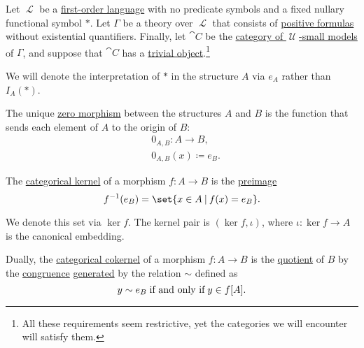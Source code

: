 \begin{proposition}\label{thm:zero_morphisms_pointed}
  Let \( \mscrL \) be a \hyperref[def:first_order_language]{first-order language} with no predicate symbols and a fixed nullary functional symbol \( \ast \). Let \( \Gamma \) be a theory over \( \mscrL \) that consists of \hyperref[def:positive_formula]{positive formulas} without existential quantifiers. Finally, let \( \cat{C} \) be the \hyperref[def:category_of_small_first_order_models]{category of \( \mscrU \)-small models} of \( \Gamma \), and suppose that \( \cat{C} \) has a \hyperref[def:trivial_object]{trivial object}.\footnote{All these requirements seem restrictive, yet the categories we will encounter will satisfy them.}

  We will denote the interpretation of \( \ast \) in the structure \( A \) via \( e_A \) rather than \( I_A(\ast) \).

  \begin{thmenum}
     The unique \hyperref[def:zero_morphisms/morphism]{zero morphism} between the structures \( A \) and \( B \) is the function that sends each element of \( A \) to the origin of \( B \):
    \begin{equation*}
      \begin{aligned}
        &0_{A,B}: A \to B, \\
        &0_{A,B}(x) \coloneqq e_B.
      \end{aligned}
    \end{equation*}

     The \hyperref[def:zero_morphisms/kernel]{categorical kernel} of a morphism \( f: A \to B \) is the \hyperref[def:set_valued_map/inverse]{preimage}
    \begin{equation*}
      f^{-1}(e_B) = \set{ x \in A \given f(x) = e_B }.
    \end{equation*}

    We denote this set via \( \ker f \). The kernel pair is \( (\ker f, \iota) \), where \( \iota: \ker f \to A \) is the canonical embedding.

     Dually, the \hyperref[def:zero_morphisms/cokernel]{categorical cokernel} of a morphism \( f: A \to B \) is the \hyperref[def:first_order_quotient]{quotient} of \( B \) by the \hyperref[def:first_order_congruence]{congruence} \hyperref[def:first_order_generated_congruence]{generated} by the relation \( {\sim} \) defined as
    \begin{equation*}
      y \sim e_B \T{if and only if} y \in f[A].
    \end{equation*}


\end{thmenum}
\end{proposition}
